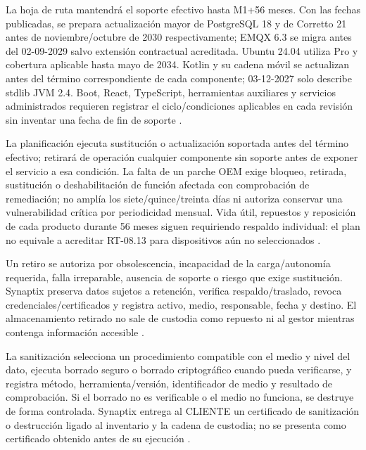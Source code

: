 La hoja de ruta mantendrá el soporte efectivo hasta M1+56 meses. Con las fechas publicadas, se prepara actualización mayor de PostgreSQL 18 y de Corretto 21 antes de noviembre/octubre de 2030 respectivamente; EMQX 6.3 se migra antes del 02-09-2029 salvo extensión contractual acreditada. Ubuntu 24.04 utiliza Pro y cobertura aplicable hasta mayo de 2034. Kotlin y su cadena móvil se actualizan antes del término correspondiente de cada componente; 03-12-2027 solo describe stdlib JVM 2.4. Boot, React, TypeScript, herramientas auxiliares y servicios administrados requieren registrar el ciclo/condiciones aplicables en cada revisión sin inventar una fecha de fin de soporte \parencites{p3-corretto}{p3-postgresql}{p3-emqx-ciclo}{p3-ubuntu-ciclo}{p3-kotlin}{p3-spring-soporte}.

La planificación ejecuta sustitución o actualización soportada antes del término efectivo; retirará de operación cualquier componente sin soporte antes de exponer el servicio a esa condición. La falta de un parche OEM exige bloqueo, retirada, sustitución o deshabilitación de función afectada con comprobación de remediación; no amplía los siete/quince/treinta días ni autoriza conservar una vulnerabilidad crítica por periodicidad mensual. Vida útil, repuestos y reposición de cada producto durante 56 meses siguen requiriendo respaldo individual: el plan no equivale a acreditar RT-08.13 para dispositivos aún no seleccionados \parencite[RT-08.13, p.~19; RT-11.04, p.~23]{pucv-transversal}.

Un retiro se autoriza por obsolescencia, incapacidad de la carga/autonomía requerida, falla irreparable, ausencia de soporte o riesgo que exige sustitución. Synaptix preserva datos sujetos a retención, verifica respaldo/traslado, revoca credenciales/certificados y registra activo, medio, responsable, fecha y destino. El almacenamiento retirado no sale de custodia como repuesto ni al gestor mientras contenga información accesible \parencite[RT-08.16/17, p.~20]{pucv-transversal}.

La sanitización selecciona un procedimiento compatible con el medio y nivel del dato, ejecuta borrado seguro o borrado criptográfico cuando pueda verificarse, y registra método, herramienta/versión, identificador de medio y resultado de comprobación. Si el borrado no es verificable o el medio no funciona, se destruye de forma controlada. Synaptix entrega al CLIENTE un certificado de sanitización o destrucción ligado al inventario y la cadena de custodia; no se presenta como certificado obtenido antes de su ejecución \parencite[RT-08.17, p.~20]{pucv-transversal}.

